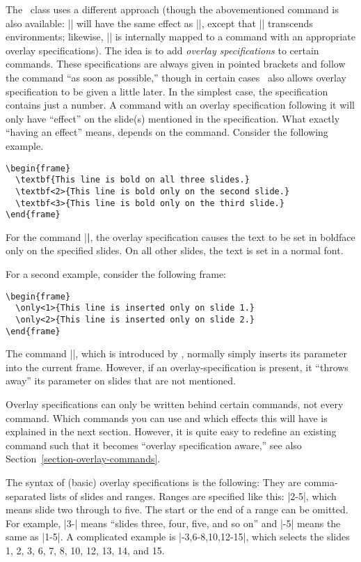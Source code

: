The \beamer\ class uses a different approach (though the abovementioned command is also available: || will have the same effect as ||, except that |\onslide| transcends environments; likewise, |\pause| is internally mapped to a command with an appropriate overlay specifications). The idea is to add \emph{overlay specifications} to certain commands. These specifications are always given in pointed brackets and follow the command ``as soon as possible,'' though in certain cases \beamer\ also allows overlay specification to be given a little later. In the simplest case, the specification contains just a number. A command with an overlay specification following it will only have ``effect'' on the slide(s) mentioned in the specification. What exactly ``having an effect'' means, depends on the command. Consider the following example.
\begin{verbatim}
\begin{frame}
  \textbf{This line is bold on all three slides.}
  \textbf<2>{This line is bold only on the second slide.}
  \textbf<3>{This line is bold only on the third slide.}
\end{frame}
\end{verbatim}

For the command |\textbf|, the overlay specification causes the text to be set in boldface only on the specified slides. On all other slides, the text is set in a normal font.

For a second example, consider the following frame:
\begin{verbatim}
\begin{frame}
  \only<1>{This line is inserted only on slide 1.}
  \only<2>{This line is inserted only on slide 2.}
\end{frame}
\end{verbatim}

The command |\only|, which is introduced by \beamer, normally simply inserts its parameter into the current frame. However, if an overlay-specification is present, it ``throws away'' its parameter on slides that are not mentioned.

Overlay specifications can only be written behind certain commands, not every command. Which commands you can use and which effects this will have is explained in the next section. However, it is quite easy to redefine an existing command such that it becomes ``overlay specification aware,'' see also Section~\ref{section-overlay-commands}.

The syntax of (basic) overlay specifications is the following: They are comma-separated lists of slides and ranges. Ranges are specified like this: |2-5|, which means slide two through to five. The start or the end of a range can be omitted. For example, |3-| means ``slides three, four, five, and so on'' and |-5| means the same as |1-5|. A complicated example is |-3,6-8,10,12-15|, which selects the slides 1, 2, 3, 6, 7, 8, 10, 12, 13, 14, and 15.

